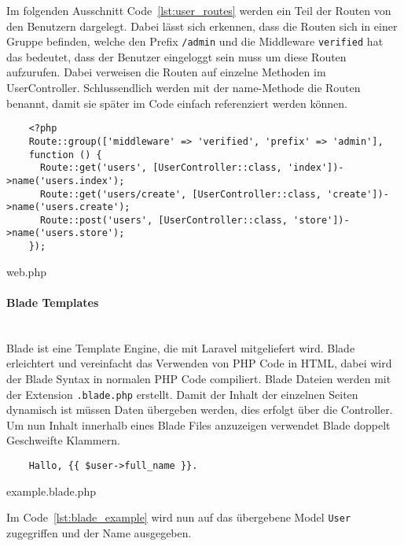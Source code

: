 Im folgenden Ausschnitt Code~\ref{lst:user_routes} werden ein Teil der Routen von den Benutzern dargelegt. Dabei lässt
sich erkennen, dass die Routen sich in einer Gruppe befinden, welche den Prefix
\verb|/admin| und die Middleware \verb|verified| hat das bedeutet, dass der Benutzer
eingeloggt sein muss um diese Routen aufzurufen. Dabei verweisen die Routen auf
einzelne Methoden im UserController. Schlussendlich werden mit der name-Methode
die Routen benannt, damit sie später im Code einfach referenziert werden können.

\begin{listing}[H]
  \begin{verbatim}
    <?php
    Route::group(['middleware' => 'verified', 'prefix' => 'admin'], 
    function () {
      Route::get('users', [UserController::class, 'index'])->name('users.index');
      Route::get('users/create', [UserController::class, 'create'])->name('users.create');
      Route::post('users', [UserController::class, 'store'])->name('users.store');
    });
  \end{verbatim}
  \caption{web.php}
  \label{lst:user_routes}
\end{listing}

\paragraph{Blade Templates}\mbox{}\\
Blade ist eine Template Engine, die mit Laravel mitgeliefert wird. Blade
erleichtert und vereinfacht das Verwenden von PHP Code in HTML, dabei wird der
Blade Syntax in normalen PHP Code compiliert. Blade Dateien werden mit der
Extension \verb|.blade.php| erstellt. Damit der Inhalt der einzelnen Seiten
dynamisch ist müssen Daten übergeben werden, dies erfolgt über die Controller.\\

Um nun Inhalt innerhalb eines Blade Files anzuzeigen verwendet Blade doppelt
Geschweifte Klammern.

\begin{listing}[H]
  \begin{verbatim}
    Hallo, {{ $user->full_name }}.
  \end{verbatim}
  \caption{example.blade.php}
  \label{lst:blade_example}
\end{listing}

Im Code~\ref{lst:blade_example} wird nun auf das übergebene Model \verb|User|
zugegriffen und der Name ausgegeben.


